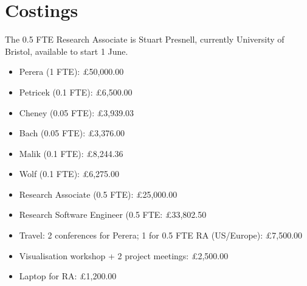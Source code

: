 \section*{Costings}

The 0.5 FTE Research Associate is Stuart Presnell, currently University of
Bristol, available to start 1 June.

\begin{itemize}
   \item Perera (1 FTE): \pounds 50,000.00
   \item Petricek (0.1 FTE): \pounds 6,500.00
   \item Cheney (0.05 FTE): \pounds 3,939.03
   \item Bach (0.05 FTE): \pounds 3,376.00
   \item Malik (0.1 FTE): \pounds 8,244.36
   \item Wolf (0.1 FTE): \pounds 6,275.00
   \item Research Associate (0.5 FTE): \pounds 25,000.00
   \item Research Software Engineer (0.5 FTE: \pounds 33,802.50
   \item Travel: 2 conferences for Perera; 1 for 0.5 FTE RA (US/Europe): \pounds 7,500.00
   \item Visualisation workshop + 2 project meetings: \pounds 2,500.00
   \item Laptop for RA: \pounds 1,200.00
\end{itemize}
